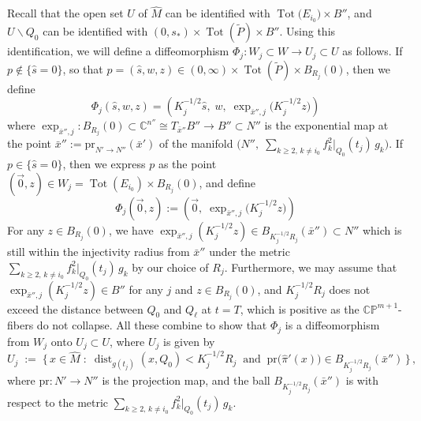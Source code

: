 \documentclass[11pt]{amsart}
\theoremstyle{plain}
\numberwithin{equation}{section}
\theoremstyle{definition}
\theoremstyle{remark}
\begin{document}
Recall that the open set $U$ of $\widehat{M}$ can be identified with $\operatorname{Tot}\big(E_{i_0}\big) \times B''$, and $U \backslash Q_0$ can be identified with $(0,s_*) \times \operatorname{Tot}(\widetilde{P}) \times B''$. Using this identification, we will define a diffeomorphism $\Phi_j : W_j \subset W \to U_j \subset U$ as follows. If $p \not\in \{\hat{s} = 0\}$, so that $p = (\hat{s},w,z) \in (0,\infty) \times \operatorname{Tot}(\widetilde{P}) \times B_{R_j}(0)$, then we define
\begin{equation}
\Phi_j(\hat{s},w,z) = \left(K_j^{-1/2}\hat{s}, \; w, \;\exp_{\bar{x}'',j}\big(K_j^{-1/2}z\big)\right)	
\end{equation}
where $\exp_{\bar{x}'',j} : B_{R_j}(0) \subset \mathbb{C}^{n''} \cong T_{\bar{x}''}B'' \to B'' \subset N''$ is the exponential map at the point $\bar{x}'' := \textrm{pr}_{N' \to N''}(\bar{x}')$ of the manifold $\Big( N'', \; \sum_{k \geq 2, \, k \neq i_0} f_k^2 |_{Q_0} ( t_j ) \, g_k \Big)$.
 If $p \in \{\hat{s} = 0\}$, then we express $p$ as the point $(\vec{0}, z) \in W_j = \operatorname{Tot}(E_{i_0}) \times B_{R_j}(0)$, and define
 \begin{equation}
 \Phi_j(\vec{0},z) := \left(\vec{0}, \;\exp_{\bar{x}'',j}\big(K_j^{-1/2}z\big)\right)
 \end{equation}
For any $z \in B_{R_j}(0)$, we have $\exp_{\bar{x}'',j}(K_j^{-1/2}z) \in B_{K_j^{-1/2}R_j}(\bar{x}'') \subset N''$ which is still within the injectivity radius from $\bar{x}''$ under the metric $\sum_{k \geq 2, \, k \neq i_0} f_k^2 |_{Q_0} ( t_j ) \, g_k$ by our choice of $R_j$. Furthermore, we may assume that $\exp_{\bar{x}'',j}(K_j^{-1/2}z) \in B''$ for any $j$ and $z \in B_{R_j}(0)$, and $K_j^{-1/2}R_j$ does not exceed the distance between $Q_0$ and $Q_\ell$ at $t = T$, which is positive as the $\mathbb{CP}^{m+1}$-fibers do not collapse. All these combine to show that $\Phi_j$ is a diffeomorphism from $W_j$ onto $U_j \subset U$, where $U_j$ is given by
\begin{equation}
U_j \;:=\; \Big\{ \, x \in \widehat{M} \;:\; \operatorname{dist}_{g ( t_j )} ( x, Q_0 ) < K_j^{-1/2} R_j \;\; \text{and} \;\; \mathrm{pr} \big( \widehat{\pi}' ( x ) \big) \in B_{K_j^{-1/2}R_j}(\bar{x}'') \, \Big\} \,,
\end{equation}
where $\mathrm{pr} : N' \to N''$ is the projection map, and the ball $B_{K_j^{-1/2}R_j}(\bar{x}'')$ is with respect to the metric $\sum_{k \geq 2, \, k \neq i_0} f_k^2 |_{Q_0} ( t_j ) \, g_k$.
\end{document}
